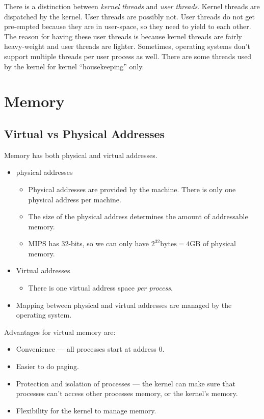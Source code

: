 \documentclass[12pt]{article}
\begin{document}
There is a distinction between \emph{kernel threads} and \emph{user
threads}.  Kernel threads are dispatched by the kernel. User threads are
possibly not. User threads do not get pre-empted because they are in user-space,
so they need to yield to each other. The reason for having these user threads is
because kernel threads are fairly heavy-weight and user threads are lighter.
Sometimes, operating systems don't support multiple threads per user process as
well.  There are some threads used by the kernel for kernel ``housekeeping'' only.

\section{Memory}

\subsection{Virtual vs Physical Addresses}

Memory has both physical and virtual addresses.
\begin{itemize}
	\item physical addresses
		\begin{itemize}
			\item Physical addresses are provided by the machine.  There is only
				one physical address per machine.
			\item The size of the physical address determines the amount of
				addressable memory.
			\item MIPS has 32-bits, so we can only have $2^{32} \text{bytes} = 4
				\text{GB}$ of physical memory.
		\end{itemize}
	\item Virtual addresses
		\begin{itemize}
			\item There is one virtual address space \emph{per process}.
		\end{itemize}
	\item Mapping between physical and virtual addresses are managed by the
		operating system.
\end{itemize}

Advantages for virtual memory are:
\begin{itemize}
	\item Convenience --- all processes start at address 0.
	\item Easier to do paging.
	\item Protection and isolation of processes --- the kernel can make sure
		that processes can't access other processes memory, or the kernel's
		memory.
	\item Flexibility for the kernel to manage memory.
\end{itemize}
\end{document}
